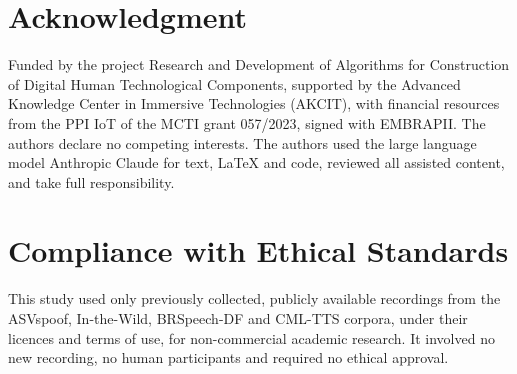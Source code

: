 \documentclass{article}
\begin{document}
\section{Acknowledgment}
Funded by the project Research and Development of Algorithms for Construction
of Digital Human Technological Components, supported by the Advanced Knowledge
Center in Immersive Technologies (AKCIT), with financial resources from the PPI
IoT of the MCTI grant 057/2023, signed with EMBRAPII. The authors declare no
competing interests.
The authors used the large language model Anthropic Claude for text, LaTeX and code, reviewed all assisted content, and take full responsibility.

\section{Compliance with Ethical Standards}
This study used only previously collected, publicly available recordings from
the ASVspoof, In-the-Wild, BRSpeech-DF and CML-TTS corpora, under their licences and
terms of use, for non-commercial academic research. It involved no new
recording, no human participants and required no ethical approval.

{\small



}
\end{document}
